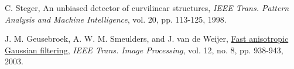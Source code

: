 \documentclass{article}
\begin{document}
\pagebreak
\begin{thebibliography}{9}
\fontsize{10pt}{12pt}\selectfont
\raggedright

        C. Steger, An unbiased detector of curvilinear structures, 
        \emph{IEEE Trans. Pattern Analysis and Machine Intelligence},
        vol. 20, pp. 113-125, 1998.

        J. M. Geusebroek, A. W. M. Smeulders, and J. van de Weijer, 
        \ul{Fast anisotropic Gaussian filtering},
        \emph{IEEE Trans. Image Processing}, vol. 12, no. 8, pp. 938-943, 2003.


\end{thebibliography}


\end{document}
